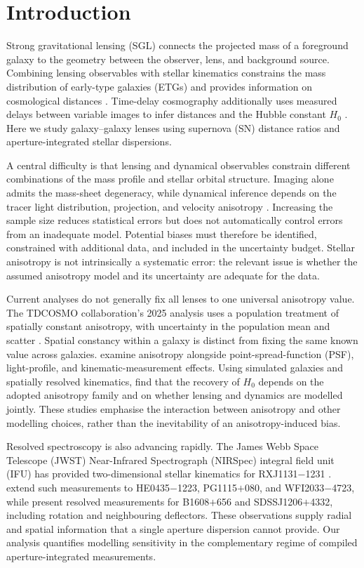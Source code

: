 \documentclass{aa}
\begin{document}
\section{Introduction}\label{sec:intro}


Strong gravitational lensing (SGL) connects the projected mass of a foreground galaxy to the geometry between the observer, lens, and background source. Combining lensing observables with stellar kinematics constrains the mass distribution of early-type galaxies (ETGs) and provides information on cosmological distances \citep{Treu2010,Koopmans2006,Cao2015}. Time-delay cosmography additionally uses measured delays between variable images to infer distances and the Hubble constant $H_0$ \citep{Suyu2017,Wong2020}. Here we study galaxy--galaxy lenses using supernova (SN) distance ratios and aperture-integrated stellar dispersions.

A central difficulty is that lensing and dynamical observables constrain different combinations of the mass profile and stellar orbital structure. Imaging alone admits the mass-sheet degeneracy, while dynamical inference depends on the tracer light distribution, projection, and velocity anisotropy \citep{Falco1985,Schneider2013,Birrer2020}. Increasing the sample size reduces statistical errors but does not automatically control errors from an inadequate model. Potential biases must therefore be identified, constrained with additional data, and included in the uncertainty budget. Stellar anisotropy is not intrinsically a systematic error: the relevant issue is whether the assumed anisotropy model and its uncertainty are adequate for the data.

Current analyses do not generally fix all lenses to one universal anisotropy value. The TDCOSMO collaboration's 2025 analysis uses a population treatment of spatially constant anisotropy, with uncertainty in the population mean and scatter \citep{TDCOSMO2025}. Spatial constancy within a galaxy is distinct from fixing the same known value across galaxies. \citet{Fores2026} examine anisotropy alongside point-spread-function (PSF), light-profile, and kinematic-measurement effects. Using simulated galaxies and spatially resolved kinematics, \citet{Verma2026} find that the recovery of $H_0$ depends on the adopted anisotropy family and on whether lensing and dynamics are modelled jointly. These studies emphasise the interaction between anisotropy and other modelling choices, rather than the inevitability of an anisotropy-induced bias.

Resolved spectroscopy is also advancing rapidly. The James Webb Space Telescope (JWST) Near-Infrared Spectrograph (NIRSpec) integral field unit (IFU) has provided two-dimensional stellar kinematics for RXJ1131$-$1231 \citep{Shajib2026}. \citet{Knabel2026} extend such measurements to HE0435$-$1223, PG1115$+$080, and WFI2033$-$4723, while \citet{Mozumdar2026} present resolved measurements for B1608$+$656 and SDSSJ1206$+$4332, including rotation and neighbouring deflectors. These observations supply radial and spatial information that a single aperture dispersion cannot provide. Our analysis quantifies modelling sensitivity in the complementary regime of compiled aperture-integrated measurements.
\end{document}
